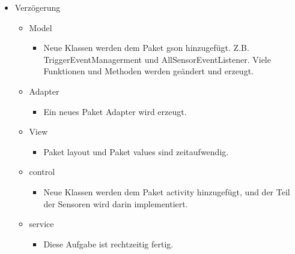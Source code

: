\documentclass[a4paper]{scrreprt}
\begin{document}
        \begin{itemize}   
         \item Verzögerung
                 \begin{itemize}
                    \item Model
                    \begin{itemize}
                        \item Neue Klassen werden dem Paket gson hinzugefügt. Z.B. TriggerEventManagerment und AllSensorEventListener. Viele Funktionen und Methoden werden geändert und erzeugt.
                     \end{itemize}
                  \end{itemize}  
                  \begin{itemize}
                        \item Adapter
                            \begin{itemize}
                            \item Ein neues Paket Adapter wird erzeugt.
                            \end{itemize}
                  \end{itemize} 
                  \begin{itemize}
                        \item View
                            \begin{itemize}
                            \item Paket layout und Paket values sind zeitaufwendig.
                            \end{itemize}
                  \end{itemize}
                   \begin{itemize}
                        \item control
                            \begin{itemize}
                            \item Neue Klassen werden dem Paket activity hinzugefügt, und der Teil der Sensoren wird darin implementiert.
                            \end{itemize}
                  \end{itemize} 
                  \begin{itemize}
                        \item service
                            \begin{itemize}
                            \item  Diese Aufgabe ist rechtzeitig fertig.

\end{itemize}
\end{itemize}
\end{itemize}
\end{document}
